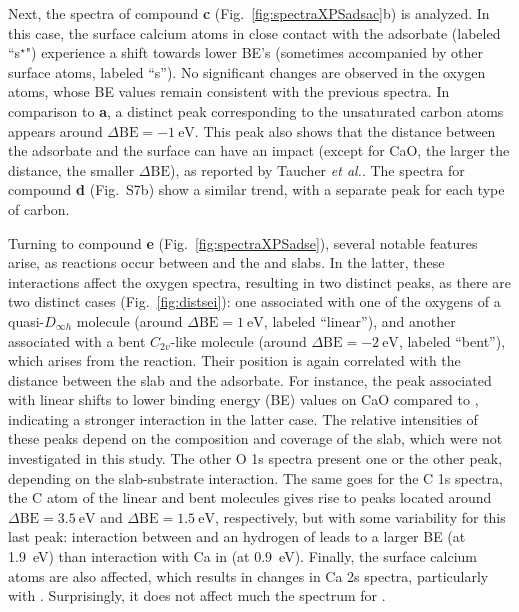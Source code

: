 \documentclass[journal=jpccck,manuscript=article]{achemso}
\def\dbe{\ensuremath{\Delta\text{BE}}}
\begin{document}
Next, the spectra of compound \textbf{c} (Fig.~\ref{fig:spectraXPSadsac}b) is analyzed. In this case, the surface calcium atoms in close contact with the adsorbate (labeled ``s$^\star$") experience a shift towards lower BE's (sometimes accompanied by other surface atoms,  labeled ``s''). No significant changes are observed in the oxygen atoms, whose BE values remain consistent with the previous spectra. In comparison to \textbf{a}, a distinct peak corresponding to the unsaturated carbon atoms appears around $\dbe = \SI{-1}{\electronvolt}$. This peak also shows that the distance between the adsorbate and the surface can have an impact (except for CaO, the larger the distance, the smaller \dbe{}), as reported by Taucher \emph{et al.}\cite{taucherFinalStateSimulationsCoreLevel2020}. The spectra for compound \textbf{d} (Fig.~S7b) show a similar trend, with a separate peak for each type of carbon.


\clearpage

Turning to compound \textbf{e} (Fig.~\ref{fig:spectraXPSadse}), several notable features arise, as reactions occur between  and the  and  slabs. In the latter, these interactions affect the oxygen spectra, resulting in two distinct peaks, as there are two distinct cases (Fig.~\ref{fig:distsei}): one associated with one of the oxygens of a quasi-$D_{\infty h}$  molecule  (around $\dbe = \SI{1}{\electronvolt}$, labeled ``linear''), and another associated with a bent $C_{2v}$-like  molecule (around $\dbe = \SI{-2}{\electronvolt}$, labeled ``bent''), which arises from the reaction. Their position is again correlated with the distance between the slab and the adsorbate. For instance, the peak associated with linear  shifts to lower binding energy (BE) values on CaO compared to , indicating a stronger interaction in the latter case. The relative intensities of these peaks depend on the composition and coverage of the slab, which were not investigated in this study.\cite{dahleSituPreparationCalcium2012,fujimoriInteractionWaterCaO2016a} The other O 1s spectra present one or the other peak, depending on the slab-substrate interaction. The same goes for the C 1s spectra, the C atom of the linear and bent  molecules gives rise to peaks located around $\dbe = \SI{3.5}{\electronvolt}$ and $\dbe = \SI{1.5}{\electronvolt}$, respectively, but with some variability for this last peak: interaction between  and an hydrogen of  leads to a larger BE (at \SI{1.9}{\electronvolt}) than interaction with Ca in  (at \SI{0.9}{\electronvolt}). Finally, the surface calcium atoms are also affected, which results in changes in Ca 2s spectra, particularly with . Surprisingly, it does not affect much the spectrum for .
\end{document}
